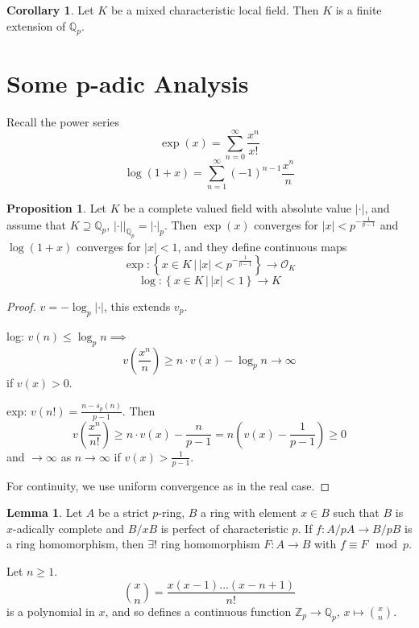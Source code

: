 \documentclass[a4paper]{article}
\theoremstyle{definition}
\theoremstyle{default}
\newtheorem{lemma}[definition]{Lemma}
\newtheorem{prop}[definition]{Proposition}
\newtheorem{corollary}[definition]{Corollary}
\theoremstyle{remark}
\newcommand*\abs[1]{\left|#1\right|}
\begin{document}
\begin{corollary}
	Let $K$ be a mixed characteristic local field.
	Then $K$ is a finite extension of $\mathbb{Q}_p$.
\end{corollary}

\section{Some p-adic Analysis}

Recall the power series
$$\exp(x) = \sum_{n=0}^\infty \frac{x^n}{x!}$$
$$\log(1+x) = \sum_{n=1}^\infty (-1)^{n-1} \frac{x^n}{n}$$

\begin{prop}
	Let $K$ be a complete valued field with absolute value $\abs{\cdot}$,
	and assume that $K \supseteq \mathbb{Q}_p$,
	$\abs{\cdot}|_{\mathbb{Q}_p} = \abs{\cdot}_p$.
	Then $\exp(x)$ converges for $\abs{x} < p^{-\frac{1}{p-1}}$ and $\log(1+x)$ converges for $\abs{x}<1$,
	and they define continuous maps
	$$\exp :\left\{x \in K \,|\, \abs{x} < p^{-\frac{1}{p-1}}\right\} \to \mathcal{O}_K$$
	$$\log: \left\{x \in K \,|\, \abs{x} < 1 \right\} \to K$$
\end{prop}
\begin{proof}
	$v=-\log_p\abs{\cdot}$, this extends $v_p$.
	
	log: $v(n) \leq \log_p n \implies$
	$$v(\frac{x^n}{n}) \geq n \cdot v(x) - \log_p n \to \infty$$
	if $v(x) > 0$.
	
	exp: $v(n!) = \frac{n-s_p(n)}{p-1}$.
	Then
	$$v(\frac{x^n}{n!}) \geq n\cdot v(x) - \frac{n}{p-1} = n(v(x)-\frac{1}{p-1}) \geq 0$$
	and $\to \infty$ as $n \to \infty$ if $v(x) > \frac{1}{p-1}$.
	
	For continuity, we use uniform convergence as in the real case.
\end{proof}

\setcounter{definition}{52}
\renewcommand{\thedefinition}{\arabic{definition}''}
\begin{lemma}
	Let $A$ be a strict $p$-ring,
	$B$ a ring with element $x \in B$ such that $B$ is $x$-adically complete and $B/xB$ is perfect of characteristic $p$.
	If $f: A/pA \to B/pB$ is a ring homomorphism,
	then $\exists!$ ring homomorphism $F:A \to B$ with $f \equiv F \mod p$.
\end{lemma}
\setcounter{definition}{60}
\renewcommand{\thedefinition}{\arabic{definition}}

Let $n\geq 1$.
$${x \choose n} = \frac{x(x-1)\dots(x-n+1)}{n!}$$
is a polynomial in $x$, and so defines a continuous function $\mathbb{Z}_p \to \mathbb{Q}_p$,
$x \mapsto {x \choose n}$.
\end{document}
